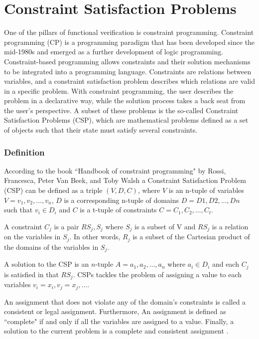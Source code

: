\section{Constraint Satisfaction Problems}
One of the pillars of functional verification is constraint programming.
Constraint programming (CP) is a programming paradigm that has been developed
since the mid-1980s and emerged as a further development of logic programming.
Constraint-based programming allows constraints and their solution mechanisms to
be integrated into a programming language. Constraints are relations between
variables, and a constraint satisfaction problem describes which relations are
valid in a specific problem. With constraint programming, the user describes the
problem in a declarative way, while the solution process takes a back seat from
the user's perspective. A subset of these problems is the so-called Constraint
Satisfaction Problems (CSP), which are mathematical problems defined as a set of
objects such that their state must satisfy several constraints.

\subsubsection{Definition}\label{sec:csp:def}
 According to the book ``Handbook of constraint programming" by Rossi,
 Francesca, Peter Van Beek, and Toby Walsh \cite{rossi2006handbook} a Constraint
 Satisfaction Problem (CSP) can be defined as a triple $(V, D, C)$, where $V$ is
 an n-tuple of variables $V = {v_1, v_2, \dots, v_n}$, $D$ is a corresponding
 n-tuple of domains $D = {D1, D2, \dots, Dn}$ such that $v_i \in D_i$ and $C$ is
 a t-tuple of constraints $C = {C_1, C_2, \dots, C_t}$.

A constraint $C_j$ is a pair ${RS_j, S_j}$ where $S_j$ is a subset of V and
$RS_j$ is a relation on the variables in $S_j$. In other words, $R_j$ is a
subset of the Cartesian product of the domains of the variables in $S_j$.

A solution to the CSP is an $n$-tuple $A = {a_1, a_2, \dots, a_n}$ where $a_i
\in D_i$ and each $C_j$ is satisfied in that $RS_j$. CSPs tackles the problem of
assigning a value to each variables ${v_i = x_i, v_j = x_j, \dots}$.

An assignment that does not violate any of the domain's constraints is called a
consistent or legal assignment. Furthermore, An assignment is defined as
``complete" if and only if all the variables are assigned to a value. Finally, a
solution to the current problem is a complete and consistent assignment
\cite{russell2002artificial}.


